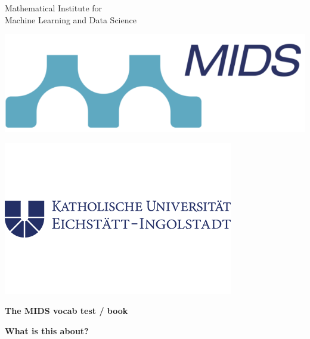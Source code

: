 \documentclass[twoside,openany]{book}
\date{}
\numberwithin{equation}{chapter}
\begin{document}
${}$\vspace{-2cm}

\noindent
\begin{minipage}[l]{0.35\textwidth}
\noindent %
\\ 
Mathematical Institute for\\
Machine Learning and Data Science
\end{minipage}
\begin{minipage}[l]{0.25\textwidth}
\includegraphics[width=\textwidth]{mids_logo.png}
\end{minipage}
\begin{minipage}[r]{0.3\textwidth}
 \hspace{1cm}\includegraphics[width=\textwidth]{KU_Logo}
\end{minipage}

\vspace*{-0.4cm}

\begin{center}
{\LARGE \textbf{The MIDS vocab test / book}}
\end{center}

\noindent
\textbf{What is this about?}
\end{document}
